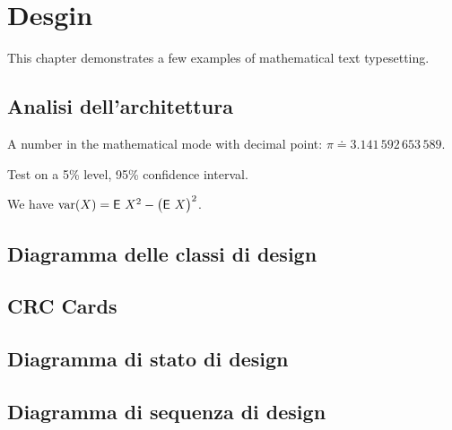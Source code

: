 %
%	 
%

\chapter{Desgin}

This chapter demonstrates a few examples of mathematical text typesetting.

\section{Analisi dell'architettura}


A number in the mathematical mode with decimal point: $\pi \doteq 3.141\,592\,653\,589$.

Test on a 5\% level, 95\% confidence interval.

We have $\operatorname{\textrm{var}}(X) = \operatorname{\textsf{E}\,} X^2 - \bigl(\operatorname{\textsf{E}\,} X \bigr)^2$.

\section{Diagramma delle classi di design}

\section{CRC  Cards}

\section{Diagramma di stato di design}

\section{Diagramma di sequenza di design}